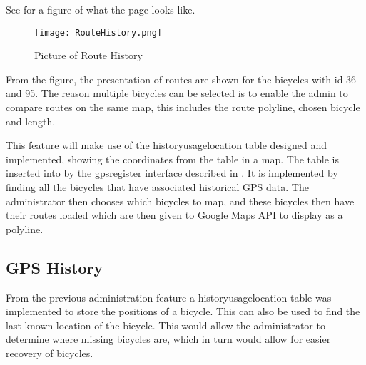 See  for a figure of what the page looks like.

\begin{figure}[H]
	\centering
	\texttt{[image: RouteHistory.png]}
	\caption{Picture of Route History}
	\label{fig:routehistory}
\end{figure}

From the figure, the presentation of routes are shown for the bicycles with id 36 and 95.
The reason multiple bicycles can be selected is to enable the admin to compare routes on the same map, this includes the route polyline, chosen bicycle and length.

This feature will make use of the historyusagelocation table designed and implemented, showing the coordinates from the table in a map.
The table is inserted into by the gpsregister interface described in .
It is implemented by finding all the bicycles that have associated historical GPS data.
The administrator then chooses which bicycles to map, and these bicycles then have their routes loaded which are then given to Google Maps API to display as a polyline.

\subsection{GPS History}\label{sec:gpsHistory}
From the previous administration feature a historyusagelocation table was implemented to store the positions of a bicycle.
This can also be used to find the last known location of the bicycle. 
This would allow the administrator to determine where missing bicycles are, which in turn would allow for easier recovery of bicycles.




